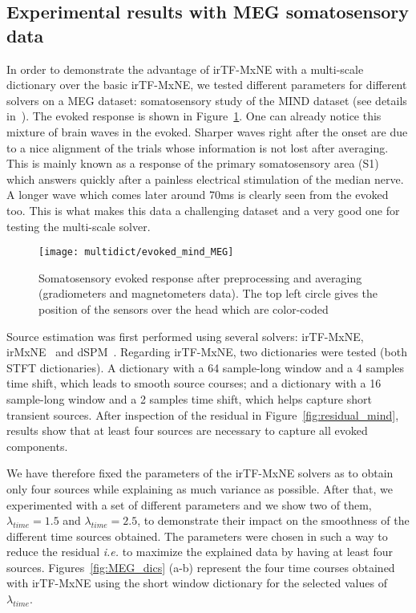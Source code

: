 \subsection{Experimental results with MEG somatosensory data}
In order to demonstrate the advantage of irTF-MxNE with a multi-scale dictionary over the basic irTF-MxNE, we tested different parameters for different solvers on a MEG dataset: somatosensory study of the MIND dataset (see details in~\cite{weisend2007paving}). The evoked response is shown in Figure~\ref{fig:evoked_mind}. One can already notice this mixture of brain waves in the evoked. Sharper waves right after the onset are due to a nice alignment of the trials whose information is not lost after averaging. This is mainly known as a response of the primary somatosensory area (S1) which answers quickly after a painless electrical stimulation of the median nerve. A longer wave which comes later around 70ms is clearly seen from the evoked too. This is what makes this data a challenging dataset and a very good one for testing the multi-scale solver.

\begin{figure}
\centering
	\texttt{[image: multidict/evoked\_mind\_MEG]}
    \caption{Somatosensory evoked response after preprocessing and averaging (gradiometers and magnetometers data). The top left circle gives the position of the sensors over the head which are color-coded}
    \label{fig:evoked_mind}
\end{figure}

Source estimation was first performed using several solvers: irTF-MxNE, irMxNE~\cite{strohmeier2014iterative} and dSPM~\cite{dale2000dynamic}. Regarding irTF-MxNE, two dictionaries were tested (both STFT dictionaries). A dictionary with a 64 sample-long window and a 4 samples time shift, which leads to smooth source courses; and a dictionary with a 16 sample-long window and a 2 samples time shift, which helps capture short transient sources. After inspection of the residual in Figure~\ref{fig:residual_mind}, results show that at least four sources are necessary to capture all evoked components. 

We have therefore fixed the parameters of the irTF-MxNE solvers as to obtain only four sources while explaining as much variance as possible. After that, we experimented with a set of different parameters and we show two of them, $\lambda_{time}=1.5$ and $\lambda_{time}=2.5$, to demonstrate their impact on the smoothness of the different time sources obtained.
The parameters were chosen in such a way to reduce the residual \textit{i.e.} to maximize the explained data by having at least four sources. 
Figures~\ref{fig:MEG_dics} (a-b) represent the four time courses obtained with irTF-MxNE using the short window dictionary for the selected values of $\lambda_{time}$.

